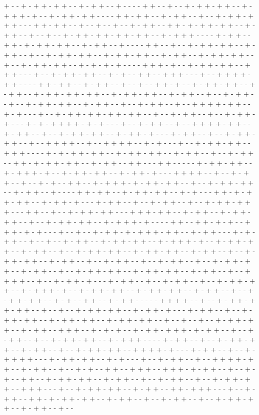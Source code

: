 + - - + - + + - + + - - + - + + - - + - - - - + + - - + - - + - + + - + + - - + - + + + - + - - + - + + - + + - - - - + + - + + - - + - + + - - + - - + - + + - + + + - - - + + - + + - - + - - + - - + - - + - + + - - + + - + - + + - + + - - + - + + - - + - - + - - + - + + - + + - + + - + + - - + - + + + - - - - + - + + - - + + - + - + + - + + - - + - + + - - + - - - - + + - - + - - + - + + - + + - - + - + + - - + - - + - + + - + + - - + - + + - + + - - + - + + - - + - + + - + + - - + - - + - + + - + + - - + - + - + - + - - - - + + + - + - - + - + + - + + - - + + + - - - + - - + - + + - + + - - + - + - - + + - - + + + - - - + - - + + + + - + + - - - - + + - + + - - + - + + - - + - - + - - + + - + - - + - + + - + + - - + - + + - - + - + + - + + - + + - - + - + + - + + - - + - + + - - + - - + - + + - - + - - + - + + - + + - - + - + + - - + - - + - + + - - + - - + + + + - + + - - + - + - - - + - - + - + + - + + - + + - + + - - + - - + - + + - - + - - + - + + - + - - - + - + - + + + + - + - + - - - + - - + - + + - - + - - + + + + - + + - - + - + + - - + - - + - + + - + + - - + - + + - + - - - + - + + - - + - - + - + + - + + - - + - - + + + + - - + - - + + + + - - + - + - - - + - - + - + + - + + - - + + + - - - - + - + - + + - + + - - + - + + - + + - - + - + + - - + - - + - + + - - + + - + - + + - + + - - + - + + - - + + - - - + + - - - - - + - + + - + + - - + - + + + - + - - + - + + - + + - - + - + + - + - - - + + + + - - + - - + - + + - - + - - + - + - - + + - - + - + + + - + - + + - + + - - + - - + - + + - + + - - + - + + - - + - - - - + + - + + - - + - + + - + + - - + - + - - - + + - + - + + - + + - - + - + + - + - - - + - + + - - + - - + - + + - - + - - + - + + - + + + - - - + + - - + - - + - + + - + + - - - + + + - + + - - + - + + - - + - + + - + + - - + - - + - + + - + + - - + - + + + - + - - - - + + - - + + - + - + - - + + + - + - + - - - + - - + - - + - + + - + - + + + - + + - - + - + + - - - + - + - + + - - + - - + - - + - + + - - + - + + - + + - - + - + + + - + - - + - + + - + + - - + - + + - - + - - + - + + - + + - - + - + + - + + - - + - + + - - + - - + - + + - + + - - + - + + - - + - - + - + + - - + - - + - + + - - + - - + - + + - + + - - + - + + - - + - - + - + + - + + - - + - + + - + + - - + - + + - - + - - + + + + - - + - - + - + + - + - - - + - + + - - + - - + - + + - - + - - + - + + - + + - - + - + + + - + - - + - + + - + + - - + - + + - + + - - + - + + - - + - - + - + + - + + - - + - + - - + + - - + - + + - - - - - + + + + - - + - - + - + + - + + - + + - - + - - + - - + - + + - + + - - + - + + - + - - - + - + + - - + - - + - + + - + + - - + - + + - + + - - + - + + - + + - - + - - + - - + - - + - + + - + + - - + - + + - - + + + - - + - + - + - - + - + + - + + + - + - + + - - + - - + - + + - - + - - + - + + - + + - - + - + + + - - - - + - + + - - + - - + - + + - + + - - + - + + - - + - - + - + + - + + - - + + + + - + - - - + - + + - - + - - + - + + + + - - - + - + + - + + - - + - + - - - + - - + - + + - - + - - + + + + - + + - - + - + + - - + - - + - + - - + + - - + + + - - + + + - + - + + - - + - - + - + - - + + - - + - + + - + + - - + - + + - - + - - + - + + - - + - - + - + + - + + - - + + + - - - + - - + - + + - + + - - + - + + - - + + - + + + - - - + - - + - + + - - + + - + - + + - + + - - + - + + - - + - - + - + + - - + - - + - + + - + + - - + - + + - - + - - 